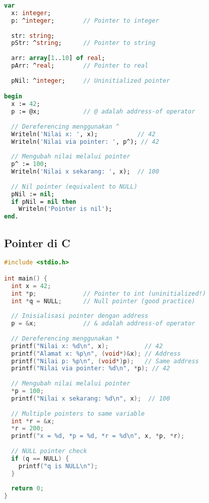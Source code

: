 \documentclass[../main.tex]{subfiles}
\begin{document}
\begin{lstlisting}[language=Pascal, caption={Deklarasi pointer di Pascal}]
var
  x: integer;
  p: ^integer;        // Pointer to integer
  
  str: string;
  pStr: ^string;      // Pointer to string
  
  arr: array[1..10] of real;
  pArr: ^real;        // Pointer to real
  
  pNil: ^integer;     // Uninitialized pointer

begin
  x := 42;
  p := @x;            // @ adalah address-of operator
  
  // Dereferencing menggunakan ^
  Writeln('Nilai x: ', x);           // 42
  Writeln('Nilai via pointer: ', p^); // 42
  
  // Mengubah nilai melalui pointer
  p^ := 100;
  Writeln('Nilai x sekarang: ', x);  // 100
  
  // Nil pointer (equivalent to NULL)
  pNil := nil;
  if pNil = nil then
    Writeln('Pointer is nil');
end.
\end{lstlisting}

\subsection{Pointer di C}

\begin{lstlisting}[language=C, caption={Deklarasi pointer di C}]
#include <stdio.h>

int main() {
  int x = 42;
  int *p;             // Pointer to int (uninitialized!)
  int *q = NULL;      // Null pointer (good practice)
  
  // Inisialisasi pointer dengan address
  p = &x;             // & adalah address-of operator
  
  // Dereferencing menggunakan *
  printf("Nilai x: %d\n", x);          // 42
  printf("Alamat x: %p\n", (void*)&x); // Address
  printf("Nilai p: %p\n", (void*)p);   // Same address
  printf("Nilai via pointer: %d\n", *p); // 42
  
  // Mengubah nilai melalui pointer
  *p = 100;
  printf("Nilai x sekarang: %d\n", x);  // 100
  
  // Multiple pointers to same variable
  int *r = &x;
  *r = 200;
  printf("x = %d, *p = %d, *r = %d\n", x, *p, *r);
  
  // NULL pointer check
  if (q == NULL) {
    printf("q is NULL\n");
  }
  
  return 0;
}
\end{lstlisting}
\end{document}
